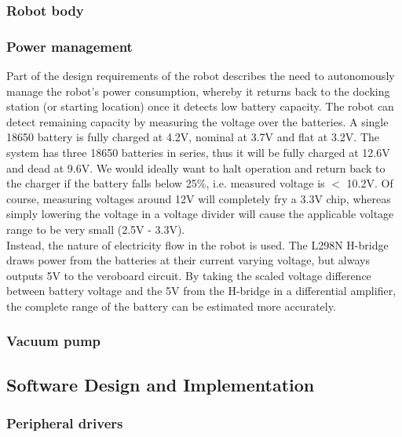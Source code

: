 \subsubsection{Robot body}
\label{sec:robot} 

\subsubsection{Power management}
\label{sec:power}

Part of the design requirements of the robot describes the need to autonomously manage the robot's power consumption, whereby it returns back to the docking station (or starting location) once it detects low battery capacity. The robot can detect remaining capacity by measuring the voltage over the batteries. A single 18650 battery is fully charged at 4.2V, nominal at 3.7V and flat at 3.2V. The system has three 18650 batteries in series, thus it will be fully charged at 12.6V and dead at 9.6V. We would ideally want to halt operation and return back to the charger if the battery falls below 25\%, i.e. measured voltage is $<$ 10.2V. Of course, measuring voltages around 12V will completely fry a 3.3V chip, whereas simply lowering the voltage in a voltage divider will cause the applicable voltage range to be very small (2.5V - 3.3V). \\

Instead, the nature of electricity flow in the robot is used. The L298N H-bridge draws power from the batteries at their current varying voltage, but always outputs 5V to the veroboard circuit. By taking the scaled voltage difference between battery voltage and the 5V from the H-bridge in a differential amplifier, the complete range of the battery can be estimated more accurately.

\subsubsection{Vacuum pump}
\label{sec:vacuum}

\subsection{Software Design and Implementation}

\subsubsection{Peripheral drivers}
\label{sec:periph}

